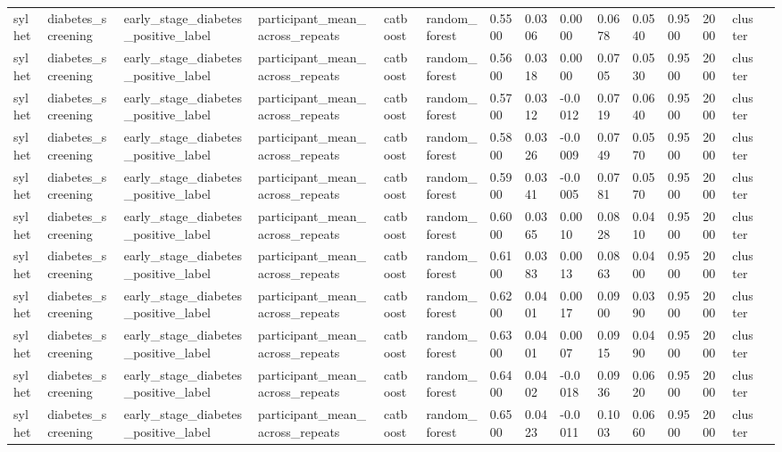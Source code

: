 \begin{tabular}{lllllllllllllll}
sylhet & diabetes\_screening & early\_stage\_diabetes\_positive\_label & participant\_mean\_across\_repeats & catboost & random\_forest & 0.5500 & 0.0306 & 0.0000 & 0.0678 & 0.0540 & 0.9500 & 2000 & cluster &  \\
sylhet & diabetes\_screening & early\_stage\_diabetes\_positive\_label & participant\_mean\_across\_repeats & catboost & random\_forest & 0.5600 & 0.0318 & 0.0000 & 0.0705 & 0.0530 & 0.9500 & 2000 & cluster &  \\
sylhet & diabetes\_screening & early\_stage\_diabetes\_positive\_label & participant\_mean\_across\_repeats & catboost & random\_forest & 0.5700 & 0.0312 & -0.0012 & 0.0719 & 0.0640 & 0.9500 & 2000 & cluster &  \\
sylhet & diabetes\_screening & early\_stage\_diabetes\_positive\_label & participant\_mean\_across\_repeats & catboost & random\_forest & 0.5800 & 0.0326 & -0.0009 & 0.0749 & 0.0570 & 0.9500 & 2000 & cluster &  \\
sylhet & diabetes\_screening & early\_stage\_diabetes\_positive\_label & participant\_mean\_across\_repeats & catboost & random\_forest & 0.5900 & 0.0341 & -0.0005 & 0.0781 & 0.0570 & 0.9500 & 2000 & cluster &  \\
sylhet & diabetes\_screening & early\_stage\_diabetes\_positive\_label & participant\_mean\_across\_repeats & catboost & random\_forest & 0.6000 & 0.0365 & 0.0010 & 0.0828 & 0.0410 & 0.9500 & 2000 & cluster &  \\
sylhet & diabetes\_screening & early\_stage\_diabetes\_positive\_label & participant\_mean\_across\_repeats & catboost & random\_forest & 0.6100 & 0.0383 & 0.0013 & 0.0863 & 0.0400 & 0.9500 & 2000 & cluster &  \\
sylhet & diabetes\_screening & early\_stage\_diabetes\_positive\_label & participant\_mean\_across\_repeats & catboost & random\_forest & 0.6200 & 0.0401 & 0.0017 & 0.0900 & 0.0390 & 0.9500 & 2000 & cluster &  \\
sylhet & diabetes\_screening & early\_stage\_diabetes\_positive\_label & participant\_mean\_across\_repeats & catboost & random\_forest & 0.6300 & 0.0401 & 0.0007 & 0.0915 & 0.0490 & 0.9500 & 2000 & cluster &  \\
sylhet & diabetes\_screening & early\_stage\_diabetes\_positive\_label & participant\_mean\_across\_repeats & catboost & random\_forest & 0.6400 & 0.0402 & -0.0018 & 0.0936 & 0.0620 & 0.9500 & 2000 & cluster &  \\
sylhet & diabetes\_screening & early\_stage\_diabetes\_positive\_label & participant\_mean\_across\_repeats & catboost & random\_forest & 0.6500 & 0.0423 & -0.0011 & 0.1003 & 0.0660 & 0.9500 & 2000 & cluster &  \\

\end{tabular}
